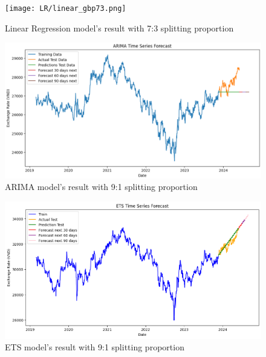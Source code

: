 \documentclass{ieeeojies}
\begin{document}
\begin{figure}[H]
  \centering
  \begin{minipage}{0.8\linewidth}
    \centering
    \texttt{[image: LR/linear\_gbp73.png]}
    \caption{Linear Regression model's result with 7:3 splitting proportion}
    \label{fig18}
  \end{minipage}
\end{figure}
\begin{figure}[H]
  \centering
  \begin{minipage}{0.8\linewidth}
    \centering
    \includegraphics[width=\linewidth]{ARIMA/arima_eur_91.png}
    \caption{ARIMA model's result with 9:1 splitting proportion}
    \label{fig19}
  \end{minipage}
\end{figure}
\begin{figure}[H]
  \centering
  \begin{minipage}{0.8\linewidth}
    \centering
    \includegraphics[width=\linewidth]{ETS/ETS_gbp_91.png}
    \caption{ETS model's result with 9:1 splitting proportion}
    \label{fig20}
  \end{minipage}
\end{figure}
\end{document}
